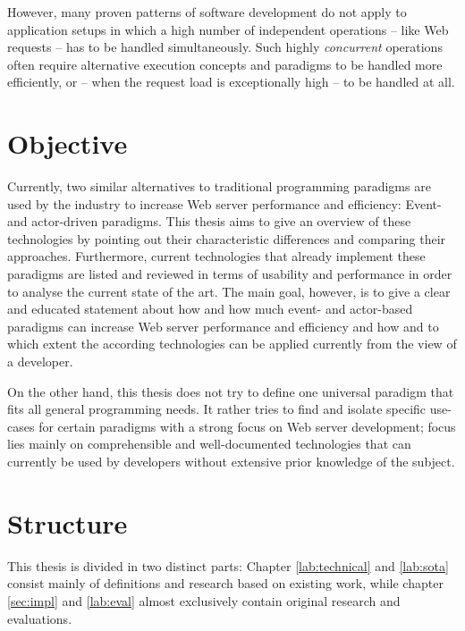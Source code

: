 However, many proven patterns of software development do not apply to application setups in which a high number of independent operations -- like Web requests -- has to be handled simultaneously. Such highly \textit{concurrent} operations often require alternative execution concepts and paradigms to be handled more efficiently, or -- when the request load is exceptionally high -- to be handled at all.

\section{Objective}
Currently, two similar alternatives to traditional programming paradigms are used by the industry to increase Web server performance and efficiency: Event- and actor-driven paradigms. This thesis aims to give an overview of these technologies by pointing out their characteristic differences and comparing their approaches. Furthermore, current technologies that already implement these paradigms are listed and reviewed in terms of usability and performance in order to analyse the current state of the art. The main goal, however, is to give a clear and educated statement about how and how much event- and actor-based paradigms can increase Web server performance and efficiency and how and to which extent the according technologies can be applied currently from the view of a developer. 

On the other hand, this thesis does not try to define one universal paradigm that fits all general programming needs. It rather tries to find and isolate specific use-cases for certain paradigms with a strong focus on Web server development; focus lies mainly on comprehensible and well-documented technologies that can currently be used by developers without extensive prior knowledge of the subject.

\section{Structure}
This thesis is divided in two distinct parts: Chapter \ref{lab:technical} and \ref{lab:sota} consist mainly of definitions and research based on existing work, while chapter \ref{sec:impl} and \ref{lab:eval} almost exclusively contain original research and evaluations.

